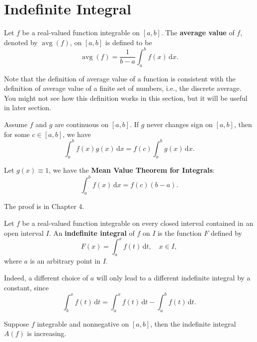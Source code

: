 	\section{Indefinite Integral}
	\begin{definitionenv}
		Let $f$ be a real-valued function integrable on $[a,b]$. The \textbf{average value} of $f$, denoted by $\operatorname{avg}(f)$, on $[a,b]$ is defined to be
		\[
		\operatorname{avg}(f)=\frac{1}{b-a}\int_a^b f(x)\,\mathrm{d}x.
		\]
	\end{definitionenv}
    \begin{remarkenv}
		Note that the definition of average value of a function is consistent with the definition of average value of a finite set of numbers, i.e., the discrete average. You might not see how this definition works in this section, but it will be useful in later section.
	\end{remarkenv}
    \begin{theoremenv}
        Assume $f$ and $g$ are continuous on $[a,b]$. If $g$ never changes sign on $[a,b]$, then for some $c\in[a,b]$, we have
        \[
        \int_a^b f(x)g(x)\,\mathrm{d}x = f(c)\int_a^b g(x)\,\mathrm{d}x.
        \]
    \end{theoremenv}
    \begin{corollaryenv}
        Let $g(x)\equiv 1$, we have the \textbf{Mean Value Theorem for Integrals}:
        \[
        \int_a^b f(x)\,\mathrm{d}x = f(c)(b-a).
        \]
    \end{corollaryenv}
    \begin{remarkenv}
        The proof is in Chapter 4.
    \end{remarkenv}
	\begin{definitionenv}
		Let $f$ be a real-valued function integrable on every closed interval contained in an open interval $I$. An \textbf{indefinite integral} of $f$ on $I$ is the function $F$ defined by
		\[
		F(x)=\int_a^x f(t)\,\mathrm{d}t,\quad x\in I,
		\]
		where $a$ is an arbitrary point in $I$.
	\end{definitionenv}
	\begin{remarkenv}
		Indeed, a different choice of $a$ will only lead to a different indefinite integral by a constant, since
		\[
		\int_b^x f(t)\,\mathrm{d}t = \int_a^x f(t)\,\mathrm{d}t - \int_a^b f(t)\,\mathrm{d}t.
		\]
	\end{remarkenv}
	\begin{theoremenv}
		Suppose $f$ integrable and nonnegative on $[a,b]$, then the indefinite integral $A(f)$ is increasing.
	\end{theoremenv}
